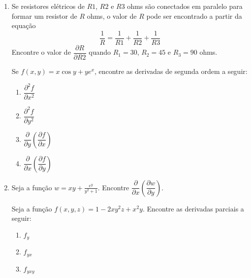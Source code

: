 \documentclass[11pt,a4paper]{article}
\begin{document}
\begin{enumerate}
	\item Se resistores elétricos de $R1$, $R2$ e $R3$ ohms são conectados em paralelo para formar um resistor de $R$ ohms, o valor de $R$ pode ser encontrado a partir da equação
	$$\frac{1}{R} = \displaystyle\frac{1}{R1} + \displaystyle\frac{1}{R2} + \displaystyle\frac{1}{R3}$$
	Encontre o valor de $\dfrac{\partial R}{\partial R2}$ quando $R_1 = 30$, $R_2 = 45$ e $R_3 = 90$ ohms.
	
	
	
	
	
	
	
	
	
	
	
	
	
	
	
	
	
	
	
	
	
	
	
	
	
	 
	
	 Se $f(x,y) = x \cos y + ye^x$, encontre as derivadas de segunda ordem a seguir:
	
	\begin{enumerate}
		\item $\dfrac{\partial^2 f}{\partial x^2}$
		\item $\dfrac{\partial^2 f}{\partial y^2}$
		\item $\dfrac{\partial }{\partial y}\left(\dfrac{\partial f}{\partial x}\right)$
		
		\item $\dfrac{\partial }{\partial x}\left(\dfrac{\partial f}{\partial y}\right)$
	\end{enumerate}	 
	
		\item Seja a função $w = xy + \displaystyle\frac{e^y}{y^2 + 1}$. Encontre $\dfrac{\partial }{\partial x}\left(\dfrac{\partial w}{\partial y}\right)$.
	
		 Seja a função $f(x,y,z) = 1 - 2xy^2z + x^2y$. Encontre as derivadas parciais a seguir:
		
		\begin{enumerate}
			\item $f_y$
			\item $f_{yx}$
			\item $f_{yxy}$
			
			
			
			
			
			
			
			
			

\end{enumerate}
\end{enumerate}
\end{document}
